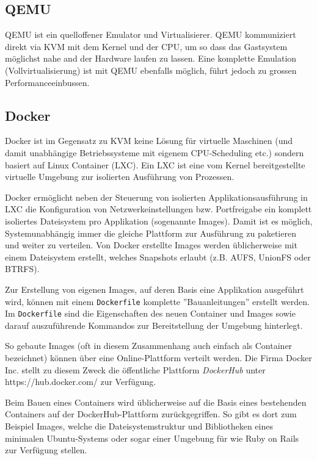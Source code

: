 \subsection{QEMU}
QEMU ist ein quelloffener Emulator und Virtualisierer. QEMU kommuniziert direkt via KVM mit dem Kernel und der CPU, um so dass das Gastsystem möglichst nahe and der Hardware laufen zu lassen. Eine komplette Emulation (Vollvirtualisierung) ist mit QEMU ebenfalls möglich, führt jedoch zu grossen Performanceeinbussen.

\subsection{Docker}
Docker ist im Gegensatz zu KVM keine Lösung für virtuelle Maschinen (und damit unabhängige Betriebssysteme mit eigenem CPU-Scheduling etc.) sondern basiert auf Linux Container (LXC). Ein LXC ist eine vom Kernel bereitgestellte virtuelle Umgebung zur isolierten Ausführung von Prozessen.

Docker ermöglicht neben der Steuerung von isolierten Applikationsausführung in LXC die Konfiguration von Netzwerkeinstellungen bzw. Portfreigabe ein komplett isoliertes Dateisystem pro Applikation (sogenannte Images). Damit ist es möglich, Systemunabhängig immer die gleiche Plattform zur Ausführung zu paketieren und weiter zu verteilen. Von Docker erstellte Images werden üblicherweise mit einem Dateisystem erstellt, welches Snapshots erlaubt (z.B. AUFS, UnionFS oder BTRFS).

Zur Erstellung von eigenen Images, auf deren Basis eine Applikation ausgeführt wird, können mit einem \lstinline[]|Dockerfile| komplette ''Bauanleitungen'' erstellt werden. Im \lstinline[]|Dockerfile| sind die Eigenschaften des neuen Container und Images sowie darauf auszuführende Kommandos zur Bereitstellung der Umgebung hinterlegt.

So gebaute Images (oft in diesem Zusammenhang auch einfach als Container bezeichnet) können über eine Online-Plattform verteilt werden. Die Firma Docker Inc. stellt zu diesem Zweck die öffentliche Plattform \emph{DockerHub} unter https://hub.docker.com/ zur Verfügung.

Beim Bauen eines Containers wird üblicherweise auf die Basis eines bestehenden Containers auf der DockerHub-Plattform zurückgegriffen. So gibt es dort zum Beispiel Images, welche die Dateisystemstruktur und Bibliotheken eines minimalen Ubuntu-Systems oder sogar einer Umgebung für  wie Ruby on Rails zur Verfügung stellen.

